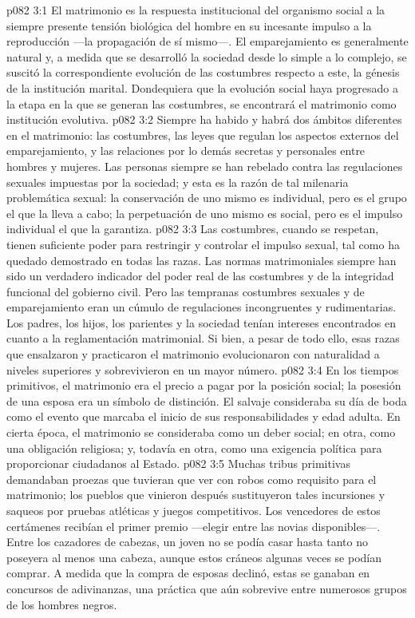 \vs p082 3:1 El matrimonio es la respuesta institucional del organismo social a la siempre presente tensión biológica del hombre en su incesante impulso a la reproducción ---la propagación de sí mismo---. El emparejamiento es generalmente natural y, a medida que se desarrolló la sociedad desde lo simple a lo complejo, se suscitó la correspondiente evolución de las costumbres respecto a este, la génesis de la institución marital. Dondequiera que la evolución social haya progresado a la etapa en la que se generan las costumbres, se encontrará el matrimonio como institución evolutiva.
\vs p082 3:2 Siempre ha habido y habrá dos ámbitos diferentes en el matrimonio: las costumbres, las leyes que regulan los aspectos externos del emparejamiento, y las relaciones por lo demás secretas y personales entre hombres y mujeres. Las personas siempre se han rebelado contra las regulaciones sexuales impuestas por la sociedad; y esta es la razón de tal milenaria problemática sexual: la conservación de uno mismo es individual, pero es el grupo el que la lleva a cabo; la perpetuación de uno mismo es social, pero es el impulso individual el que la garantiza.
\vs p082 3:3 Las costumbres, cuando se respetan, tienen suficiente poder para restringir y controlar el impulso sexual, tal como ha quedado demostrado en todas las razas. Las normas matrimoniales siempre han sido un verdadero indicador del poder real de las costumbres y de la integridad funcional del gobierno civil. Pero las tempranas costumbres sexuales y de emparejamiento eran un cúmulo de regulaciones incongruentes y rudimentarias. Los padres, los hijos, los parientes y la sociedad tenían intereses encontrados en cuanto a la reglamentación matrimonial. Si bien, a pesar de todo ello, esas razas que ensalzaron y practicaron el matrimonio evolucionaron con naturalidad a niveles superiores y sobrevivieron en un mayor número.
\vs p082 3:4 \pc En los tiempos primitivos, el matrimonio era el precio a pagar por la posición social; la posesión de una esposa era un símbolo de distinción. El salvaje consideraba su día de boda como el evento que marcaba el inicio de sus responsabilidades y edad adulta. En cierta época, el matrimonio se consideraba como un deber social; en otra, como una obligación religiosa; y, todavía en otra, como una exigencia política para proporcionar ciudadanos al Estado.
\vs p082 3:5 Muchas tribus primitivas demandaban proezas que tuvieran que ver con robos como requisito para el matrimonio; los pueblos que vinieron después sustituyeron tales incursiones y saqueos por pruebas atléticas y juegos competitivos. Los vencedores de estos certámenes recibían el primer premio ---elegir entre las novias disponibles---. Entre los cazadores de cabezas, un joven no se podía casar hasta tanto no poseyera al menos una cabeza, aunque estos cráneos algunas veces se podían comprar. A medida que la compra de esposas declinó, estas se ganaban en concursos de adivinanzas, una práctica que aún sobrevive entre numerosos grupos de los hombres negros.
